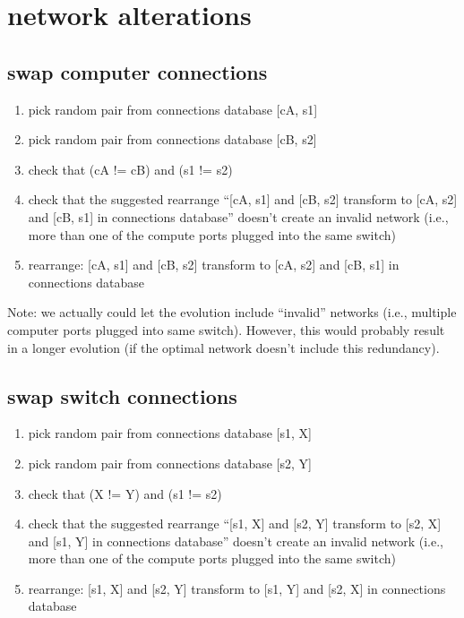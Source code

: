 \documentclass[pdftex]{article}
\begin{document}
\section{network alterations}

\subsection{swap computer connections}

\begin{enumerate}
 \item pick random pair from connections database {[}cA, s1]
 \item pick random pair from connections database {[}cB, s2]
 \item check that (cA != cB) and (s1 != s2)
 \item check that the suggested rearrange ``{[}cA, s1] and {[}cB, s2] transform to {[}cA, s2] and {[}cB, s1] in connections database'' doesn't create an invalid network (i.e., more than one of the compute ports plugged into the same switch)
 \item rearrange: {[}cA, s1] and {[}cB, s2] transform to {[}cA, s2] and {[}cB, s1] in connections database
\end{enumerate}

Note: we actually could let the evolution include ``invalid'' networks (i.e., multiple computer ports plugged into same switch). However, this would probably result in a longer evolution (if the optimal network doesn't include this redundancy).

\subsection{swap switch connections}

\begin{enumerate}
 \item pick random pair from connections database {[}s1, X]
 \item pick random pair from connections database {[}s2, Y]
 \item check that (X != Y) and (s1 != s2)
 \item check that the suggested rearrange ``{[}s1, X] and {[}s2, Y] transform to {[}s2, X] and {[}s1, Y] in connections database'' doesn't create an invalid network (i.e., more than one of the compute ports plugged into the same switch)
 \item rearrange: {[}s1, X] and {[}s2, Y] transform to {[}s1, Y] and {[}s2, X] in connections database
\end{enumerate}
\end{document}
